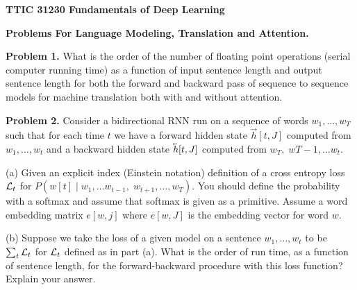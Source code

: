 \documentclass{article}
\begin{document}
\centerline{\bf TTIC 31230 Fundamentals of Deep Learning}
\medskip
\centerline{\bf Problems For Language Modeling, Translation and Attention.}

\bigskip
\bigskip
{\bf Problem 1.} What is the order of the number of floating point operations (serial computer running time)
as a function of input sentence length and output sentence length
for both the forward and backward pass of sequence to sequence models for machine translation both with and without attention.

\bigskip
{\bf Problem 2.} Consider a bidirectional RNN run on a sequence of words $w_1,\ldots,w_T$ such that for each time $t$ we have a forward
hidden state $\vec{h}[t,J]$ computed from $w_1,\ldots,w_t$ and a backward hidden state $\cev{h}[t,J]$ computed from $w_T,\;w{T-1},\ldots w_t$.

\medskip
(a) Given an explicit index (Einstein notation) definition of a cross entropy loss ${\cal L}_t$ for $P(w[t]\;|\;w_1,\ldots w_{t-1},\;w_{t+1},\ldots,w_T)$.  You should define
the probability with a softmax and assume that softmax is given as a primitive.  Assume a word embedding matrix $e[w,j]$ where $e[w,J]$ is the embedding vector for word $w$.

\medskip
(b) Suppose we take the loss of a given model on a sentence $w_1,\ldots,w_t$ to be $\sum_t {\cal L}_t$ for ${\cal L}_t$ defined as in part (a).  What is the order
of run time, as a function of sentence length, for the forward-backward procedure with this loss function?  Explain your answer.
\end{document}
